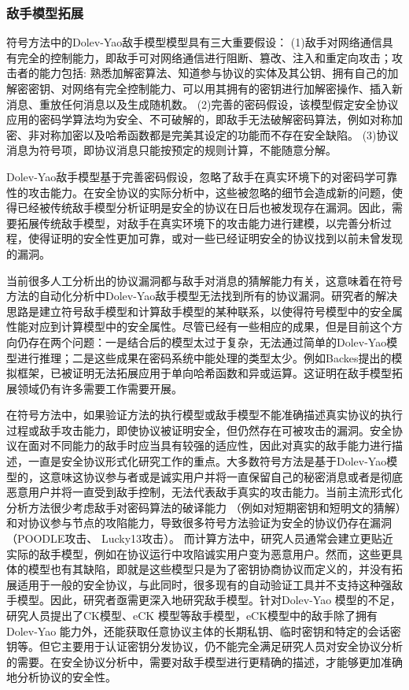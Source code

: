 \subsubsection{敌手模型拓展}
符号方法中的Dolev-Yao敌手模型模型具有三大重要假设：
(1)敌手对网络通信具有完全的控制能力，即敌手可对网络通信进行阻断、篡改、注入和重定向攻击；攻击者的能力包括: 熟悉加解密算法、知道参与协议的实体及其公钥、拥有自己的加解密密钥、对网络有完全控制能力、可以用其拥有的密钥进行加解密操作、插入新消息、重放任何消息以及生成随机数。
(2)完善的密码假设，该模型假定安全协议应用的密码学算法均为安全、不可破解的，即敌手无法破解密码算法，例如对称加密、非对称加密以及哈希函数都是完美其设定的功能而不存在安全缺陷。
(3)协议消息为符号项，即协议消息只能按预定的规则计算，不能随意分解。

Dolev-Yao敌手模型基于完善密码假设，忽略了敌手在真实环境下的对密码学可靠性的攻击能力。在安全协议的实际分析中，这些被忽略的细节会造成新的问题，使得已经被传统敌手模型分析证明是安全的协议在日后也被发现存在漏洞。因此，需要拓展传统敌手模型，对敌手在真实环境下的攻击能力进行建模，以完善分析过程，使得证明的安全性更加可靠，或对一些已经证明安全的协议找到以前未曾发现的漏洞。

当前很多人工分析出的协议漏洞都与敌手对消息的猜解能力有关，这意味着在符号方法的自动化分析中Dolev-Yao敌手模型无法找到所有的协议漏洞。研究者的解决思路是建立符号敌手模型和计算敌手模型的某种联系，以使得符号模型中的安全属性能对应到计算模型中的安全属性。尽管已经有一些相应的成果，但是目前这个方向仍存在两个问题：一是结合后的模型太过于复杂，无法通过简单的Dolev-Yao模型进行推理；二是这些成果在密码系统中能处理的类型太少。例如Backes提出的模拟框架\cite{backes2007reactive}，已被证明无法拓展应用于单向哈希函数\cite{Backes2004}和异或运算\cite{Backes2011}。这证明在敌手模型拓展领域仍有许多需要工作需要开展。

在符号方法中，如果验证方法的执行模型或敌手模型不能准确描述真实协议的执行过程或敌手攻击能力，即使协议被证明安全，但仍然存在可被攻击的漏洞。安全协议在面对不同能力的敌手时应当具有较强的适应性，因此对真实的敌手能力进行描述，一直是安全协议形式化研究工作的重点。大多数符号方法是基于Dolev-Yao模型的，这意味这协议参与者或是诚实用户并将一直保留自己的秘密消息或者是彻底恶意用户并将一直受到敌手控制，无法代表敌手真实的攻击能力。当前主流形式化分析方法很少考虑敌手对密码算法的破译能力
（例如对短期密钥和短明文的猜解）和对协议参与节点的攻陷能力，导致很多符号方法验证为安全的协议仍存在漏洞（POODLE攻击\cite{Moller2014}、 Lucky13攻击\cite{AlFardan2013}）。 而计算方法中，研究人员通常会建立更贴近实际的敌手模型\cite{Dowling2015}，例如在协议运行中攻陷诚实用户变为恶意用户\cite{Backes2004}。然而，这些更具体的模型也有其缺陷，即就是这些模型只是为了密钥协商协议而定义的，并没有拓展适用于一般的安全协议，与此同时，很多现有的自动验证工具并不支持这种强敌手模型。因此，研究者亟需更深入地研究敌手模型。针对Dolev-Yao 模型的不足，研究人员提出了CK模型、eCK 模型\cite{Canetti2002}等敌手模型，eCK模型中的敌手除了拥有Dolev-Yao 能力外，还能获取任意协议主体的长期私钥、临时密钥和特定的会话密钥等。但它主要用于认证密钥分发协议，仍不能完全满足研究人员对安全协议分析的需要。在安全协议分析中，需要对敌手模型进行更精确的描述，才能够更加准确地分析协议的安全性。


